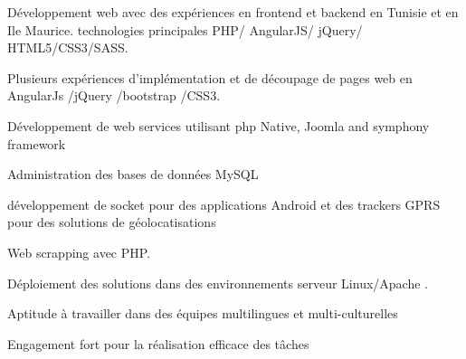 \begin{cventries}
  \cventry
    {}
    {}
    {}
    {}
    {
      \begin{cvitems}
        \item {Développement  web avec des expériences en frontend et backend en Tunisie et en Ile Maurice. technologies principales  PHP/ AngularJS/ jQuery/ HTML5/CSS3/SASS.}
        \item {Plusieurs expériences d'implémentation et de découpage de pages web en  AngularJs /jQuery /bootstrap /CSS3.}        
        \item {Développement de web services  utilisant php Native, Joomla and symphony framework}
        \item {Administration des bases de données MySQL}
        \item {développement de socket pour des applications Android et des trackers GPRS pour des solutions de géolocatisations} \item {Web scrapping avec PHP.}   
        \item {Déploiement des solutions dans des environnements serveur Linux/Apache .} 
        \item {Aptitude à travailler dans des équipes multilingues et multi-culturelles} 
        \item {Engagement fort pour la réalisation efficace des tâches}         
      \end{cvitems}
    }
\end{cventries}
